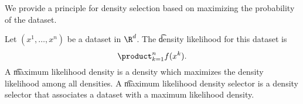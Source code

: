 

We provide a principle for density selection based on maximizing the probability of the dataset.


Let $(x^1, \dots, x^n)$ be a dataset in $\R^d$.
The \t{density likelihood} for this dataset is
\[
  \product_{k = 1}^{n} f(x^k).
\]
A \t{maximum likelihood density} is a density which maximizes the density likelihood among all densities.
A \t{maximum likelihood density selector} is a density selector that associates a dataset with a maximum likelihood density.


\blankpage
